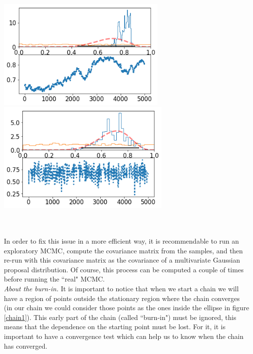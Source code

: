 \documentclass[onecolumn,           %
               showpacs,            %
               preprintnumbers,     %
               aps,                 %
               prl,          	    %
               letterpaper,             %
               superscriptaddress,      %
               nofootinbib,         %
               tightenlines,        %
               floats,floatfix      %
               ,usenatbib,
               ]{revtex4-1}
\begin{document}
\begin{minipage}{\textwidth}
\centering
\includegraphics[height=5.5cm]{Figures/chain2.png}
\includegraphics[height=5.5cm]{Figures/chain3.png}
\label{chainprop}
\end{minipage}\\ $ $ \\

In order to fix this issue in a more efficient way, it is recommendable to run an exploratory MCMC, compute the covariance matrix from the samples, and then re-run with this covariance matrix as the covariance of a multivariate Gaussian proposal distribution. Of course, this process can be computed a couple of times before running the ``real" MCMC.\\

\textit{About the burn-in.} It is important to notice that when we start a chain we will have a region of points outside the stationary region where the chain converges (in our chain we could consider those points as the ones inside the ellipse in figure \ref{chain1}). This early part of the chain (called ``burn-in") must be ignored, this means that the dependence on the starting point must be lost. For it, it is important to have a convergence test which can help us to know when the chain has converged.\\
\end{document}
